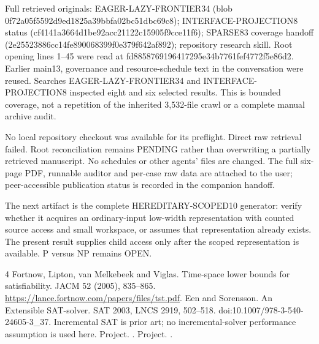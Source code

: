 \documentclass[11pt]{article}
\begin{document}
Full retrieved originals: EAGER-LAZY-FRONTIER34 (blob 0f72a05f5592d9ed1825a39bbfa02bc51dbc69c8); INTERFACE-PROJECTION8 status (cf4141a3664d1be92acc21122c15905f9cce11f6); SPARSE83 coverage handoff (2e25523886cc14fe890068399f0e379f642af892); repository research skill. Root opening lines 1--45 were read at fd8858769196417295e34b7761fef4772f5e86d2. Earlier main13, governance and resource-schedule text in the conversation were reused. Searches EAGER-LAZY-FRONTIER34 and INTERFACE-PROJECTION8 inspected eight and six selected results. This is bounded coverage, not a repetition of the inherited 3,532-file crawl or a complete manual archive audit.

No local repository checkout was available for its preflight. Direct raw retrieval failed. Root reconciliation remains PENDING rather than overwriting a partially retrieved manuscript. No schedules or other agents' files are changed. The full six-page PDF, runnable auditor and per-case raw data are attached to the user; peer-accessible publication status is recorded in the companion handoff.

The next artifact is the complete HEREDITARY-SCOPED10 generator: verify whether it acquires an ordinary-input low-width representation with counted source access and small workspace, or assumes that representation already exists. The present result supplies child access only after the scoped representation is available. P versus NP remains OPEN.

\begin{thebibliography}{4}
 Fortnow, Lipton, van Melkebeek and Viglas. Time-space lower bounds for satisfiability. JACM 52 (2005), 835--865. \url{https://lance.fortnow.com/papers/files/tst.pdf}.
 Een and Sorensson. An Extensible SAT-solver. SAT 2003, LNCS 2919, 502--518. doi:10.1007/978-3-540-24605-3_37. Incremental SAT is prior art; no incremental-solver performance assumption is used here.
 Project. .
 Project. .
\end{thebibliography}
\end{document}
